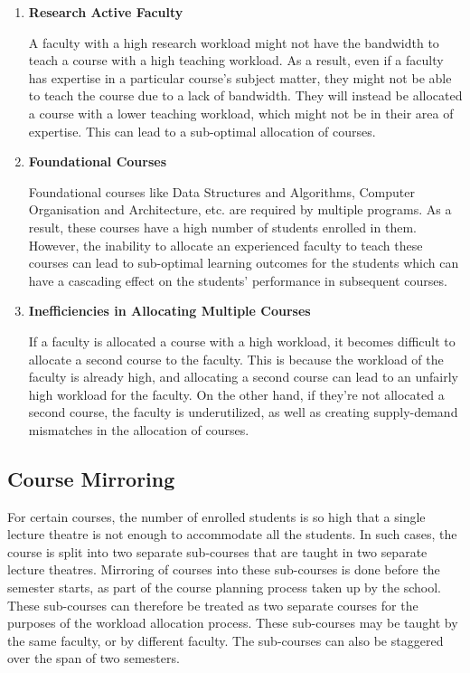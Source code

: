 \begin{enumerate}

  \item \textbf{Research Active Faculty}

        A faculty with a high research workload might not have the bandwidth to teach a course with a high teaching workload. As a result, even if a faculty has expertise in a particular course's subject matter, they might not be able to teach the course due to a lack of bandwidth. They will instead be allocated a course with a lower teaching workload, which might not be in their area of expertise. This can lead to a sub-optimal allocation of courses.

  \item \textbf{Foundational Courses}

        Foundational courses like Data Structures and Algorithms, Computer Organisation and Architecture, etc. are required by multiple programs. As a result, these courses have a high number of students enrolled in them. However, the inability to allocate an experienced faculty to teach these courses can lead to sub-optimal learning outcomes for the students which can have a cascading effect on the students' performance in subsequent courses.

  \item \textbf{Inefficiencies in Allocating Multiple Courses}

        If a faculty is allocated a course with a high workload, it becomes difficult to allocate a second course to the faculty. This is because the workload of the faculty is already high, and allocating a second course can lead to an unfairly high workload for the faculty. On the other hand, if they're not allocated a second course, the faculty is underutilized, as well as creating supply-demand mismatches in the allocation of courses.

\end{enumerate}

\subsection{Course Mirroring}

For certain courses, the number of enrolled students is so high that a single lecture theatre is not enough to accommodate all the students. In such cases, the course is split into two separate sub-courses that are taught in two separate lecture theatres. Mirroring of courses into these sub-courses is done before the semester starts, as part of the course planning process taken up by the school. These sub-courses can therefore be treated as two separate courses for the purposes of the workload allocation process.  These sub-courses may be taught by the same faculty, or by different faculty. The sub-courses can also be staggered over the span of two semesters.


